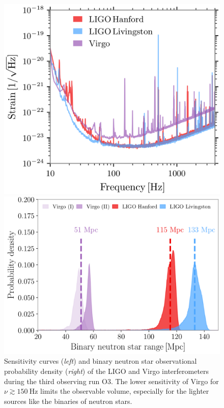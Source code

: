 \documentclass[a4paper,titlepage]{book}     	%
\begin{document}
\begin{figure}
	\begin{minipage}{.47\textwidth}
		\centering
		\includegraphics[width=\textwidth]{./images/sensitivity.png}
	\end{minipage}
	\hfill
	\begin{minipage}{.53\textwidth}
		\centering
		\includegraphics[width=1.02\textwidth]{./images/O3BNSrange.png}	
	\end{minipage}
	\caption{Sensitivity curves (\emph{left}) and binary neutron star observational probability density (\emph{right}) of the LIGO and Virgo interferometers during the third observing run O3. The lower sensitivity of Virgo for $\nu \gtrsim 150~\text{Hz}$ limits the observable volume, especially for the lighter sources like the binaries of neutron stars. \cite{GWTC-3}}\label{fig:O3sensitivity}
\end{figure}
\end{document}

